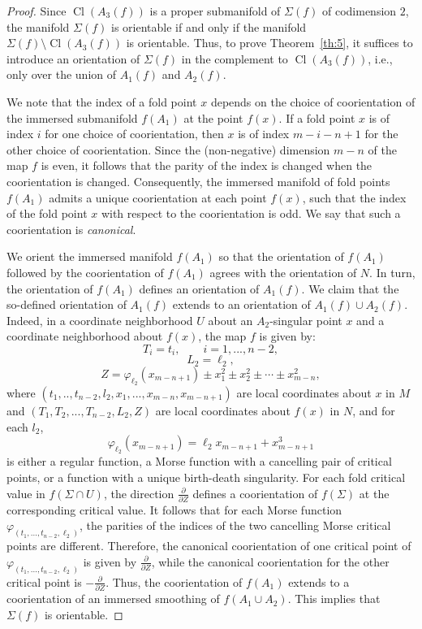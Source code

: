\documentclass[12pt]{amsart}
\theoremstyle{definition}
\begin{document}
\begin{proof} Since $\mathop\mathrm{Cl}(A_3(f))$ is a proper submanifold of $\Sigma(f)$ of codimension $2$, the manifold $\Sigma(f)$ is orientable if and only if the manifold $\Sigma(f)\setminus \mathop\mathrm{Cl}(A_3(f))$ is orientable. Thus, to prove Theorem~\ref{th:5}, 
it suffices to introduce an orientation of $\Sigma(f)$ in the complement to $\mathop\mathrm{Cl}(A_3(f))$, i.e., only over the union of $A_1(f)$ and $A_2(f)$. 

We note that the index of a fold point $x$ depends on the choice of coorientation of the immersed submanifold $f(A_1)$ at the point $f(x)$. If a fold point $x$ is of index $i$ for one choice of coorientation, then $x$ is of index $m-i-n+1$ for the other choice of  coorientation. Since the (non-negative) dimension $m-n$ of the map $f$ is even, it follows that the parity of the index is changed when the coorientation is changed. Consequently, the immersed manifold of fold points $f(A_1)$ admits a unique coorientation at each point $f(x)$,  such that the index of the fold point $x$ with respect to the coorientation is odd. We say that such a coorientation is \emph{canonical}. 

We orient the immersed manifold $f(A_1)$ so that the orientation of $f(A_1)$ followed by the coorientation of $f(A_1)$ agrees with the orientation of $N$. In turn, the orientation of $f(A_1)$ defines an orientation of $A_1(f)$. 
We claim that the so-defined orientation of $A_1(f)$ extends to an orientation of $A_1(f)\cup A_2(f)$. Indeed, in a coordinate neighborhood $U$ about an $A_2$-singular point $x$ and a coordinate neighborhood about $f(x)$,  the map $f$ is given by:
\[
  T_i = t_i, \qquad i=1, ..., n-2, 
  \]
  \[
  L_2=\ell_2, 
  \]
  \[
  Z= \varphi_{\ell_2} (x_{m-n+1}) \pm x_1^2 \pm x_2^2 \pm \cdots \pm x_{m-n}^2, 
  \]
  where $(t_1,.., t_{n-2}, l_2, x_1,..., x_{m-n}, x_{m-n+1})$ are local coordinates about $x$ in $M$ and $(T_1, T_2, ..., T_{n-2}, L_2, Z)$ are local coordinates about $f(x)$ in $N$, and for each $l_2$, 
  \[
\varphi_{\ell_2} (x_{m-n+1})=  \ell_2 x_{m-n+1} + x_{m-n+1}^3
\] 
is either a regular function, a Morse function with a cancelling pair of critical points, or a function with a unique birth-death singularity. For each fold critical value in $f(\Sigma\cap U)$, the direction $\frac{\partial}{\partial Z}$ defines a coorientation of $f(\Sigma)$ at the corresponding critical value. It follows that for each Morse function $\varphi_{(t_1,..., t_{n-2}, \ell_2)}$,  the parities of the indices of the two cancelling Morse critical points are different. 
Therefore, the canonical coorientation of one critical point of $\varphi_{(t_1,..., t_{n-2}, \ell_2)}$ is given by $\frac{\partial}{\partial Z}$, while the canonical coorientation for the other critical point is $-\frac{\partial}{\partial Z}$.  Thus, the coorientation of $f(A_1)$ extends to a coorientation of an immersed smoothing of $f(A_1\cup A_2)$. This implies that $\Sigma(f)$ is orientable. 
\end{proof}
\end{document}
